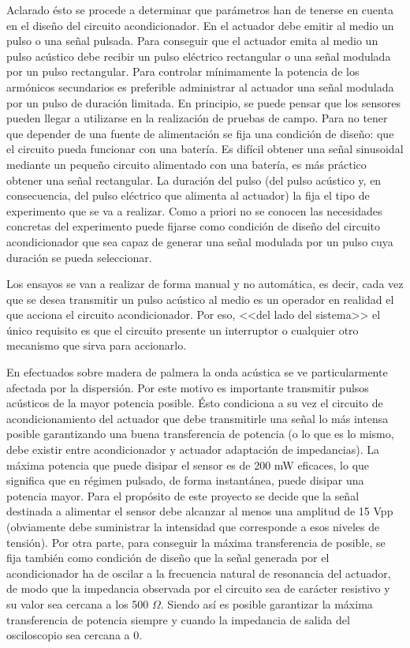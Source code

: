 Aclarado ésto se procede a determinar que parámetros han de tenerse en
cuenta en el diseño del circuito acondicionador. En  el actuador
debe emitir al medio un pulso o una señal pulsada. Para conseguir que el
actuador emita al medio un pulso acústico debe recibir un pulso eléctrico
rectangular o una señal modulada por un pulso rectangular. Para controlar
mínimamente la potencia de los armónicos secundarios es preferible
administrar al actuador una señal modulada por un pulso de duración
limitada. En principio, se puede pensar que los sensores pueden llegar a
utilizarse en la realización de pruebas de campo. Para no tener que
depender de una fuente de alimentación se fija una condición de diseño: que
el circuito pueda funcionar con una batería. Es difícil obtener una señal
sinusoidal mediante un pequeño circuito alimentado con una batería, es más
práctico obtener una señal rectangular. La duración del pulso (del pulso
acústico y, en consecuencia, del pulso eléctrico que alimenta al actuador)
la fija el tipo de experimento que se va a realizar. Como a priori no se
conocen las necesidades concretas del experimento puede fijarse como
condición de diseño del circuito acondicionador que sea capaz de generar
una señal modulada por un pulso cuya duración se pueda seleccionar.

Los ensayos se van a realizar de forma manual y no automática, es decir,
cada vez que se desea transmitir un pulso acústico al medio es un operador
en realidad el que acciona el circuito acondicionador. Por eso, <<del lado
del sistema>> el único requisito es que el circuito presente un interruptor
o cualquier otro mecanismo que sirva para accionarlo.

En  efectuados sobre madera de palmera la onda acústica se ve
particularmente afectada por la dispersión. Por este motivo es importante
transmitir pulsos acústicos de la mayor potencia posible. Ésto condiciona a
su vez el circuito de acondicionamiento del actuador que debe transmitirle
una señal lo más intensa posible garantizando una buena transferencia de
potencia (o lo que es lo mismo, debe existir entre acondicionador y
actuador adaptación de impedancias). La máxima potencia que puede disipar
el sensor es de 200 mW eficaces, lo que significa que en régimen pulsado,
de forma instantánea, puede disipar una potencia mayor. Para el propósito
de este proyecto se decide que la señal destinada a alimentar el sensor
debe alcanzar al menos una amplitud de 15 Vpp (obviamente debe suministrar
la intensidad que corresponde a esos niveles de tensión). Por otra parte,
para conseguir la máxima transferencia de posible, se fija también como
condición de diseño que la señal generada por el acondicionador ha de
oscilar a la frecuencia natural de resonancia del actuador, de modo que la
impedancia observada por el circuito sea de carácter resistivo y su valor
sea cercana a los 500 $\Omega$. Siendo así es posible garantizar la máxima
transferencia de potencia siempre y cuando la impedancia de salida del
osciloscopio sea cercana a 0.


